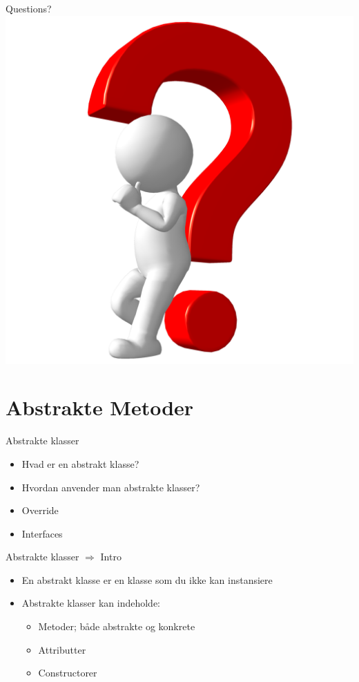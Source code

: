 \documentclass[10pt,aspectratio=1610]{beamer}
\begin{document}
\begin{frame}{Questions?}
            \includegraphics[width=\linewidth, height=\paperheight]{images/man-with-question-01.png}
\end{frame}


\section{Abstrakte Metoder}

\begin{frame}{Abstrakte klasser}
    \begin{itemize}
        \item Hvad er en abstrakt klasse?
        \item Hvordan anvender man abstrakte klasser?
        \item Override
        \item Interfaces
    \end{itemize}
\end{frame}

\begin{frame}{Abstrakte klasser $\Rightarrow$ Intro}
  \begin{itemize}
    \item En abstrakt klasse er en klasse som du ikke kan instansiere
    \item Abstrakte klasser kan indeholde:
    \begin{itemize}
        \item Metoder; både abstrakte og konkrete
        \item Attributter
        \item Constructorer
    \end{itemize}
  \end{itemize}
\end{frame}
\end{document}
